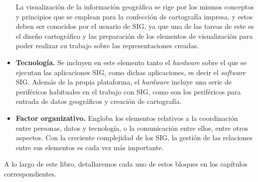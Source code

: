 \begin{itemize}
La visualización de la información geográfica se rige por los mismos conceptos y principios que se emplean para la confección de cartografía impresa, y estos deben ser conocidos por el usuario de SIG, ya que una de las tareas de este es el diseño cartográfico y las preparación de los elementos de visualización para poder realizar su trabajo sobre las representaciones creadas. 

\item \textbf{Tecnología.} Se incluyen en este elemento tanto el \emph{hardware} sobre el que se ejecutan las aplicaciones SIG, como dichas aplicaciones, es decir el \emph{software} SIG. Además de la propia plataforma, el \emph{hardware} incluye una serie de periféricos habituales en el trabajo con SIG, como son los periféricos para entrada de datos geográficos y creación de cartografía. 

\item \textbf{Factor organizativo.} Engloba los elementos relativos a la coordinación entre personas, datos y tecnología, o la comunicación entre ellos, entre otros aspectos. Con la creciente complejidad de los SIG, la gestión de las relaciones entre sus elementos es cada vez más importante.
\end{itemize}

A lo largo de este libro, detallaremos cada uno de estos bloques en los capítulos correspondientes.




\pagestyle{empty}